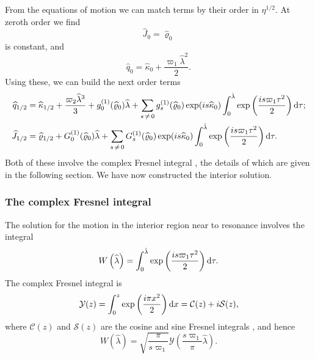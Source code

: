 From the equations of motion we can match terms by their order in $\eta^{1/2}$. At zeroth order we find
\begin{equation}
\widehat{J}_0 = \widehat{\varrho}_0
\end{equation}
is constant, and
\begin{equation}
\widehat{q}_0 = \widehat{\kappa}_0 + \dfrac{\varpi_1\widehat{\lambda}^2}{2}.
\end{equation}
Using these, we can build the next order terms
\begin{align}
\widehat{q}_{1/2} = {} & \widehat{\kappa}_{1/2} + \dfrac{\varpi_2\widehat{\lambda}^3}{3} + g_0^{(1)}(\widehat{\varrho}_0)\widehat{\lambda} + \sum_{s\,\neq\,0}g_s^{(1)}(\widehat{\varrho}_0)\exp(is \widehat{\kappa}_0)\int_{0}^{\hat{\lambda}}{\exp\left(\dfrac{is \varpi_1\tau^2}{2}\right)}\,\mathrm{d}{\tau}; \\
\widehat{J}_{1/2} = {} & \widehat{\varrho}_{1/2} + G_0^{(1)}(\widehat{\varrho}_0)\widehat{\lambda} + \sum_{s\,\neq\,0}G_s^{(1)}(\widehat{\varrho}_0)\exp(is \widehat{\kappa}_0)\int_{0}^{\hat{\lambda}}{\exp\left(\dfrac{is \varpi_1\tau^2}{2}\right)}\,\mathrm{d}{\tau}.
\end{align}
Both of these involve the complex Fresnel integral \citep[chapter 7]{Olver2010}, the details of which are given in the following section. We have now constructed the interior solution.

\subsubsection{The complex Fresnel integral}

The solution for the motion in the interior region near to resonance involves the integral
\begin{equation}
W\left(\widehat{\lambda}\right) = \int_{0}^{\hat{\lambda}}{\exp\left(\dfrac{is \varpi_1\tau^2}{2}\right)}\,\mathrm{d}{\tau}.
\end{equation}
The complex Fresnel integral is
\begin{equation}
\mathcal{Y}(z) = \int_{0}^{z}{\exp\left(\dfrac{i\pi x^2}{2}\right)}\,\mathrm{d}{x} = \mathcal{C}(z) + i\mathcal{S}(z),
\end{equation}
where $\mathcal{C}(z)$ and $\mathcal{S}(z)$ are the cosine and sine Fresnel integrals \citep[7.2.7, 7.2.8]{Olver2010}, and hence
\begin{equation}
W\left(\widehat{\lambda}\right) = \sqrt{\dfrac{\pi}{s\varpi_1}}\mathcal{Y}\left(\dfrac{s\varpi_1}{\pi}\widehat{\lambda}\right).
\end{equation}

